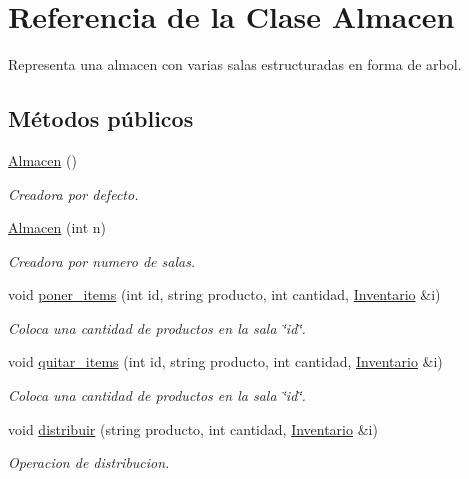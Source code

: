 \hypertarget{class_almacen}{}\section{Referencia de la Clase Almacen}
\label{class_almacen}


Representa una almacen con varias salas estructuradas en forma de arbol.  


\subsection*{Métodos públicos}
\begin{DoxyCompactItemize}
\item 
\hyperlink{class_almacen_a68a6084d5775d391c52d4825072a0612}{Almacen} ()
\begin{DoxyCompactList}\small\item\em Creadora por defecto. \end{DoxyCompactList}\item 
\hyperlink{class_almacen_ae5ed0e91d616199b8dbdc1f8780a7efb}{Almacen} (int n)
\begin{DoxyCompactList}\small\item\em Creadora por numero de salas. \end{DoxyCompactList}\item 
void \hyperlink{class_almacen_a5532f34bea73002793d637b2031698c8}{poner\+\_\+items} (int id, string producto, int cantidad, \hyperlink{class_inventario}{Inventario} \&i)
\begin{DoxyCompactList}\small\item\em Coloca una cantidad de productos en la sala \char`\"{}id\char`\"{}. \end{DoxyCompactList}\item 
void \hyperlink{class_almacen_ab28cb9537ce54d2c67d1c85f69c2e09c}{quitar\+\_\+items} (int id, string producto, int cantidad, \hyperlink{class_inventario}{Inventario} \&i)
\begin{DoxyCompactList}\small\item\em Coloca una cantidad de productos en la sala \char`\"{}id\char`\"{}. \end{DoxyCompactList}\item 
void \hyperlink{class_almacen_a9e266b71d6ab186830abb7b3a367ecc0}{distribuir} (string producto, int cantidad, \hyperlink{class_inventario}{Inventario} \&i)
\begin{DoxyCompactList}\small\item\em Operacion de distribucion. \end{DoxyCompactList}\item 

\end{DoxyCompactItemize}
